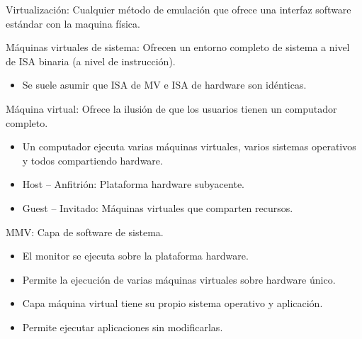 \documentclass[12pt, twoside, openright]{report} %
\begin{document}
    Virtualización: Cualquier método de emulación que ofrece una
    interfaz software estándar con la maquina física.

    Máquinas virtuales de sistema: Ofrecen un entorno completo de
    sistema a nivel de ISA binaria (a nivel de instrucción).

    \begin{itemize}
    
    \item
      Se suele asumir que ISA de MV e ISA de hardware son idénticas.
    \end{itemize}

    Máquina virtual: Ofrece la ilusión de que los usuarios tienen un
    computador completo.
    \vspace{-0.5cm}

    \begin{itemize}
    
    \item
      Un computador ejecuta varias máquinas virtuales, varios sistemas
      operativos y todos compartiendo hardware.
    \item
      Host -- Anfitrión: Plataforma hardware subyacente.
    \item
      Guest -- Invitado: Máquinas virtuales que comparten recursos.
    \end{itemize}

    MMV: Capa de software de sistema.
\vspace{-0.5cm}
    \begin{itemize}
    
    \item
      El monitor se ejecuta sobre la plataforma hardware.
    \item
      Permite la ejecución de varias máquinas virtuales sobre hardware
      único.
    \item
      Capa máquina virtual tiene su propio sistema operativo y
      aplicación.
    \item
      Permite ejecutar aplicaciones sin modificarlas.
    \end{itemize}
\end{document}
